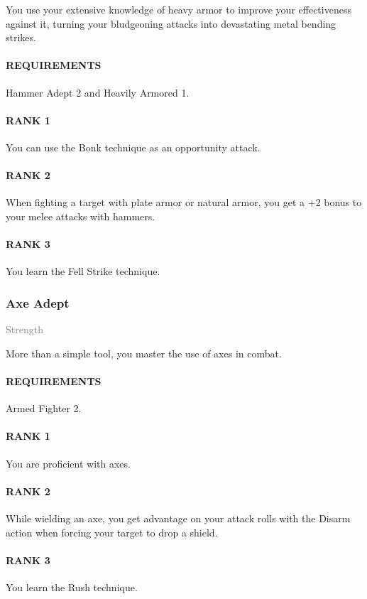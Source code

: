\normalsize
You use your extensive knowledge of heavy armor to improve your effectiveness against it, turning your bludgeoning attacks into devastating metal bending strikes.
\paragraph{REQUIREMENTS} Hammer Adept 2 and Heavily Armored 1.
\paragraph{RANK 1} You can use the Bonk technique as an opportunity attack.
\paragraph{RANK 2} When fighting a target with plate armor or natural armor, you get a +2 bonus to your melee attacks with hammers.
\paragraph{RANK 3} You learn the Fell Strike technique.

\subsubsection{Axe Adept} \label{feat::axeadept}
\small{\textcolor{gray}{Strength}}

\normalsize
More than a simple tool, you master the use of axes in combat.
\paragraph{REQUIREMENTS} Armed Fighter 2.
\paragraph{RANK 1} You are proficient with axes.
\paragraph{RANK 2} While wielding an axe, you get advantage on your attack rolls with the Disarm action when forcing your target to drop a shield.
\paragraph{RANK 3} You learn the Rush technique.

